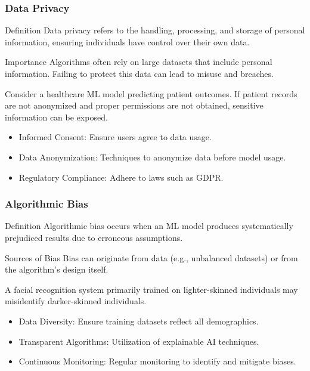 \documentclass[aspectratio=169]{beamer}
\begin{document}
\begin{frame}[fragile]
    \frametitle{Data Privacy}
    \begin{block}{Definition}
        Data privacy refers to the handling, processing, and storage of personal information, ensuring individuals have control over their own data.
    \end{block}
    
    \begin{block}{Importance}
        Algorithms often rely on large datasets that include personal information. Failing to protect this data can lead to misuse and breaches.
    \end{block}

    \begin{example}
        Consider a healthcare ML model predicting patient outcomes. If patient records are not anonymized and proper permissions are not obtained, sensitive information can be exposed.
    \end{example}

    \begin{itemize}
        \item Informed Consent: Ensure users agree to data usage.
        \item Data Anonymization: Techniques to anonymize data before model usage.
        \item Regulatory Compliance: Adhere to laws such as GDPR.
    \end{itemize}
\end{frame}

\begin{frame}[fragile]
    \frametitle{Algorithmic Bias}
    \begin{block}{Definition}
        Algorithmic bias occurs when an ML model produces systematically prejudiced results due to erroneous assumptions.
    \end{block}
    
    \begin{block}{Sources of Bias}
        Bias can originate from data (e.g., unbalanced datasets) or from the algorithm's design itself.
    \end{block}

    \begin{example}
        A facial recognition system primarily trained on lighter-skinned individuals may misidentify darker-skinned individuals.
    \end{example}

    \begin{itemize}
        \item Data Diversity: Ensure training datasets reflect all demographics.
        \item Transparent Algorithms: Utilization of explainable AI techniques.
        \item Continuous Monitoring: Regular monitoring to identify and mitigate biases.
    \end{itemize}
\end{frame}
\end{document}
